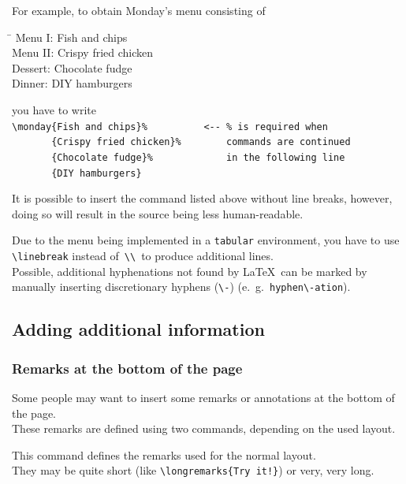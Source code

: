 \documentclass[11pt]{ltxdoc}
\begin{document}
	For example, to obtain Monday's menu consisting of
	\begin{multicols}{2}
		\begin{tabbing}
			\hspace{2cm}\=\kill
			Menu I:		\> Fish and chips \\
			Menu II:	\> Crispy fried chicken \\
			Dessert:	\> Chocolate fudge \\
			Dinner:		\> DIY hamburgers
		\end{tabbing}
	\end{multicols}
	you have to write \\
	\verb|\monday{Fish and chips}%          <-- % is required when| \\\nopagebreak[4]
	\verb|       {Crispy fried chicken}%        commands are continued| \\\nopagebreak[4]
	\verb|       {Chocolate fudge}%             in the following line| \\\nopagebreak[4]
	\verb|       {DIY hamburgers}|
	
	\smallskip
	It is possible to insert the command listed above without line breaks, however, doing so will result in the source being less human-readable.
	
	\smallskip
	Due to the menu being implemented in a \texttt{tabular} environment, you have to use \verb|\linebreak| instead of \,\verb|\\|\, to produce additional lines. \\
	Possible, additional hyphenations not found by \LaTeX\ can be marked by manually inserting discretionary hyphens (\verb|\-|) (e.~g.~\verb|hyphen\-ation|).
	
	
	\subsection{Adding additional information}
	\subsubsection{Remarks at the bottom of the page} \label{sec:remarks}
	Some people may want to insert some remarks or annotations at the bottom of the page. \\
	These remarks are defined using two commands, depending on the used layout.
	
	\medskip
	\DescribeMacro{\longremarks}
	This command defines the remarks used for the normal layout. \\
	They may be quite short (like \verb|\longremarks{Try it!}|) or very, very long.
	
\end{document}
